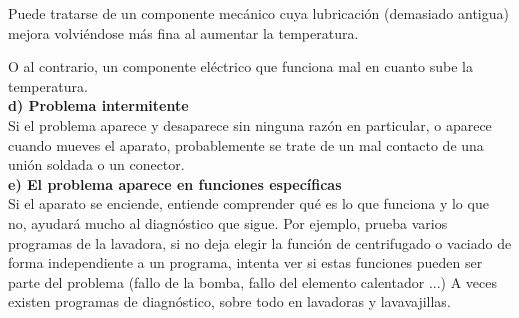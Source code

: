 Puede tratarse de un componente mecánico cuya lubricación (demasiado antigua) mejora volviéndose más fina al aumentar la temperatura.

O al contrario, un componente eléctrico que funciona mal en cuanto sube la
temperatura.\\
\newpage
{\large \textbf{d) Problema intermitente}}\\

Si el problema aparece y desaparece sin ninguna razón en particular, o aparece cuando mueves el aparato, probablemente se trate de un mal contacto de una unión soldada o un conector.\\

{\large \textbf{e) El problema aparece en funciones específicas}}\\

Si el aparato se enciende, entiende comprender qué es lo que funciona y lo que no, ayudará mucho al diagnóstico que sigue.
Por ejemplo, prueba varios programas de la lavadora, si no deja elegir la función de centrifugado o vaciado de forma independiente a un programa, intenta ver si estas funciones pueden ser parte del problema (fallo de la bomba, fallo del elemento calentador ...)
A veces existen programas de diagnóstico, sobre todo en lavadoras y lavavajillas.
\newpage
